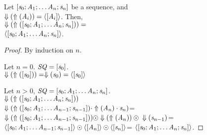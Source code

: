 \documentclass[numbers,10pt,preprint\ifanon ,nocopyrightspace\fi]{sigplanconf}
\begin{document}



\begin{lemma}
  \label{lem:sequence-rx}
  Let $[\mathit{s}_0;\mathit{A}_1;
    \ldots\mathit{A}_n;\mathit{s}_n]$ be a sequence,
  and\\
  $\Downarrow(\Uparrow(\mathit{A}_i))=\langle[\mathit{A}_i]\rangle$.
  Then,\\$\Downarrow(\Uparrow([\mathit{s}_0;\mathit{A}_1;
    \ldots\mathit{A}_n;\mathit{s}_n]))=$\\
  $\langle[\mathit{s}_0;\mathit{A}_1;
      \ldots\mathit{A}_n;\mathit{s}_n]\rangle$.
\end{lemma}
\begin{proof}
  By induction on $n$.

  Let $n=0$.
  $\mathit{SQ}=[\mathit{s}_0]$.\\
  $\Downarrow(\Uparrow([\mathit{s}_0]))=
  \Downarrow(\mathit{s}_0)=\langle[\mathit{s}_0]\rangle$

  Let $n>0$,
  $\mathit{SQ}=[\mathit{s}_0;\mathit{A}_1;
    \ldots\mathit{A}_n;\mathit{s}_n]$.\\
  $\Downarrow(\Uparrow([\mathit{s}_0;\mathit{A}_1;
    \ldots\mathit{A}_n;\mathit{s}_n]))$\\
  $\Downarrow(\Uparrow([\mathit{s}_0;\mathit{A}_1;
    \ldots\mathit{A}_{n-1};\mathit{s}_{n-1}])\cdot\Uparrow(\mathit{A}_n)
  \cdot\mathit{s}_n)$=\\
  $\Downarrow(\Uparrow([\mathit{s}_0;\mathit{A}_1;
    \ldots\mathit{A}_{n-1};\mathit{s}_{n-1}]))
  \odot
  \Downarrow(\Uparrow(\mathit{A}_n))
  \odot\\
  \Downarrow(\mathit{s}_{n-1})$=
  $\langle[\mathit{s}_0;\mathit{A}_1;
      \ldots\mathit{A}_{n-1};\mathit{s}_{n-1}]\rangle
  \odot\\
  \langle[\mathit{A}_n]\rangle
  \odot
  \langle[\mathit{s}_n]\rangle$=
  $\langle[\mathit{s}_0;\mathit{A}_1;
      \ldots\mathit{A}_n;\mathit{s}_n]\rangle$.
\end{proof}
\end{document}
